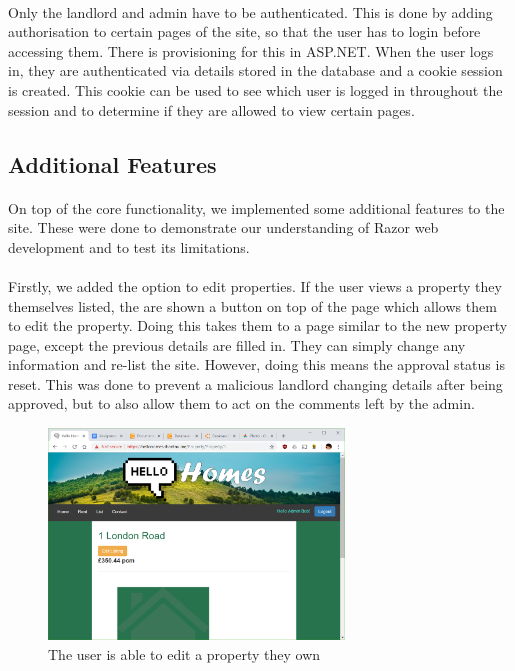 \documentclass{article}
\begin{document}
        \paragraph{}
            Only the landlord and admin have to be authenticated.
            This is done by adding authorisation to certain pages of the site, so that the user has to login before accessing them.
            There is provisioning for this in ASP.NET.
            When the user logs in, they are authenticated via details stored in the database and a cookie session is created.
            This cookie can be used to see which user is logged in throughout the session and to determine if they are allowed to view certain pages.

    \subsection{Additional Features}
        \paragraph{}
            On top of the core functionality, we implemented some additional features to the site.
            These were done to demonstrate our understanding of Razor web development and to test its limitations.

        \paragraph{}
            Firstly, we added the option to edit properties.
            If the user views a property they themselves listed, the are shown a button on top of the page which allows them to edit the property.
            Doing this takes them to a page similar to the new property page, except the previous details are filled in.
            They can simply change any information and re-list the site.
            However, doing this means the approval status is reset.
            This was done to prevent a malicious landlord changing details after being approved, but to also allow them to act on the comments left by the admin.

            \begin{figure}[!htb]
                \centering
                \includegraphics[width=0.7\textwidth]{figures/edit_properties.png}
                \caption[Edit Properties]{The user is able to edit a property they own}
            \end{figure}
\end{document}
